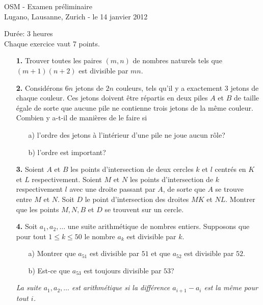 \documentclass[11pt,a4paper]{article}
\theoremstyle{plain}
\theoremstyle{definition}
\theoremstyle{remark}
\begin{document}
\pagestyle{empty}

\begin{center}
{\huge OSM - Examen préliminaire} \\
\medskip Lugano, Lausanne, Zurich - le 14 janvier 2012
\end{center}
\vspace{8mm}
Durée: 3 heures\\
Chaque exercice vaut 7 points.

\vspace{15mm}

\begin{enumerate}

\item[\textbf{1.}] 
Trouver toutes les paires $(m,n)$ de nombres naturels tels que $(m+1)(n+2)$ est divisible par $mn$.

\bigskip

\item[\textbf{2.}] 
Considérons $6n$ jetons de $2n$ couleurs, tels qu'il y a exactement $3$ jetons de chaque couleur. Ces jetons doivent être répartis en deux piles $A$ et $B$ de taille égale de sorte que aucune pile ne contienne trois jetons de la même couleur.
Combien y a-t-il de manières de le faire si 
\begin{enumerate}
 \item[a)] l'ordre des jetons à l'intérieur d'une pile ne joue aucun rôle?
 \item[b)] l'ordre est important?
\end{enumerate}

\bigskip

\item[\textbf{3.}]
Soient $A$ et $B$ les points d'intersection de deux cercles $k$ et $l$ centrés en $K$ et $L$ respectivement. Soient $M$ et $N$ les points d'intersection de $k$ respectivement $l$ avec une droite passant par $A$, de sorte que $A$ se trouve entre $M$ et $N$. Soit $D$ le point d'intersection des droites $MK$ et $NL$. Montrer que les points $M,N,B$ et $D$ se trouvent sur un cercle.

\bigskip

\item[\textbf{4.}] 
Soit $a_1,a_2,\ldots$ une suite arithmétique de nombres entiers. Supposons que pour tout $1\leq k\leq 50$ le nombre $a_k$ est divisible par $k$.
\begin{enumerate}
 \item[a)] Montrer que $a_{51}$ est divisible par $51$ et que $a_{52}$ est divisible par $52$.
 \item[b)] Est-ce que $a_{53}$ est toujours divisible par $53$?
\end{enumerate}
\begin{small}
\emph{La suite $a_1,a_2,\ldots$ est arithmétique si la différence $a_{i+1}-a_i$ est la même pour tout $i$.}
\end{small}


\end{enumerate}
\end{document}
